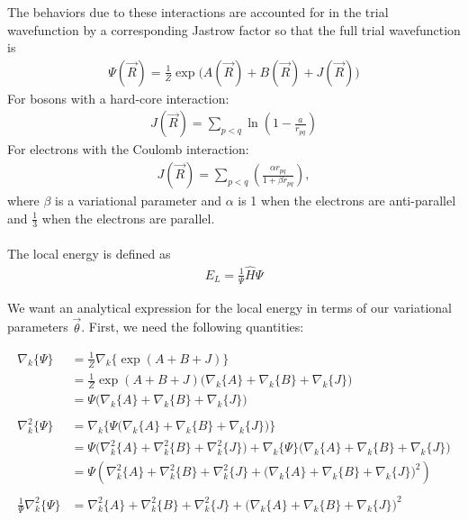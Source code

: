 \documentclass[12pt]{article}
\begin{document}
\noindent The behaviors due to these interactions are accounted for in the trial wavefunction by a corresponding Jastrow factor so that the full trial wavefunction is 
\begin{align*}
\Psi (\vec{R}) = \frac{1}{Z} \exp \Big( A(\vec{R})+B(\vec{R})+J(\vec{R}) \Big)
\end{align*}
For bosons with a hard-core interaction:
\begin{align*}
J(\vec{R}) = \sum_{p<q} \ln \left( 1-\frac{a}{r_{pq}} \right)
\end{align*}
For electrons with the Coulomb interaction:
\begin{align*}
J(\vec{R}) = \sum_{p<q} \left( \frac{\alpha r_{pq}}{1+\beta r_{pq}} \right),
\end{align*}
where $\beta$ is a variational parameter and $\alpha$ is 1 when the electrons are anti-parallel and $\frac{1}{3}$ when the electrons are parallel.\\ \\

\noindent The local energy is defined as
\begin{align*}
E_L = \frac{1}{\Psi} \hat{H} \Psi
\end{align*}

\noindent We want an analytical expression for the local energy in terms of our variational parameters $\vec{\theta}$. First, we need the following quantities:

\begin{align*}
\nabla_k \{ \Psi \} &= \frac{1}{Z} \nabla_k \Big\{ \exp(A+B+J) \Big\} \\
&= \frac{1}{Z} \exp(A+B+J) \Big( \nabla_k \{ A \} + \nabla_k \{ B \} +\nabla_k \{ J \} \Big)\\
& = \Psi \Big( \nabla_k \{ A \} + \nabla_k \{ B \} +\nabla_k \{ J \} \Big) \\ \\
\nabla_k^2 \{\Psi \} &= \nabla_k \Big\{ \Psi \Big( \nabla_k \{ A \} + \nabla_k \{ B \} +\nabla_k \{ J \} \Big) \Big\}\\
&= \Psi \Big( \nabla_k^2 \{ A \} + \nabla_k^2 \{ B \} +\nabla_k^2 \{ J \} \Big) + \nabla_k \{ \Psi \} \Big( \nabla_k \{ A \} + \nabla_k \{ B \} +\nabla_k \{ J \} \Big)\\
&= \Psi \left(  \nabla_k^2 \{ A \} + \nabla_k^2 \{ B \} +\nabla_k^2 \{ J \}  + \Big( \nabla_k \{ A \} + \nabla_k \{ B \} +\nabla_k \{ J \} \Big)^2 \right)\\ \\ 
\frac{1}{\Psi} \nabla_k^2 \{ \Psi \} &= \nabla_k^2 \{ A \} + \nabla_k^2 \{ B \} +\nabla_k^2 \{ J \}  + \Big( \nabla_k \{ A \} + \nabla_k \{ B \} +\nabla_k \{ J \} \Big)^2\\ \\
\end{align*}
\end{document}
